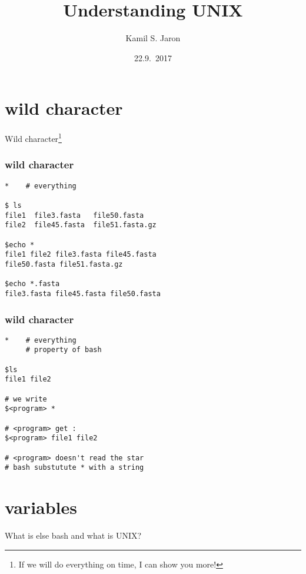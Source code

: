 \documentclass[xcolor=dvipsnames]{beamer}
\title[ ]{Understanding UNIX}
\author{Kamil S. Jaron}
\date{22.9.~2017}
\begin{document}
\begin{frame}
	\titlepage
\end{frame}

\section{wild character}

\begin{frame}
	\begin{center}
		\huge
		Wild character\footnote{If we will do everything on time, I can show you more!} \\
	\end{center}
\end{frame}

\begin{frame}[fragile]
\frametitle{wild character}
\large
\begin{verbatim}
*    # everything

$ ls
file1  file3.fasta   file50.fasta
file2  file45.fasta  file51.fasta.gz

$echo *
file1 file2 file3.fasta file45.fasta
file50.fasta file51.fasta.gz

$echo *.fasta
file3.fasta file45.fasta file50.fasta
\end{verbatim}
\end{frame}

\begin{frame}[fragile]
\frametitle{wild character}
\large
\begin{verbatim}
*    # everything
     # property of bash

$ls
file1 file2

# we write
$<program> *

# <program> get :
$<program> file1 file2

# <program> doesn't read the star
# bash substutute * with a string
\end{verbatim}
\end{frame}

\section{variables}

\begin{frame}
	\begin{center}
		\huge
		What is else bash and what is UNIX?\\
	\end{center}
\end{frame}
\end{document}
